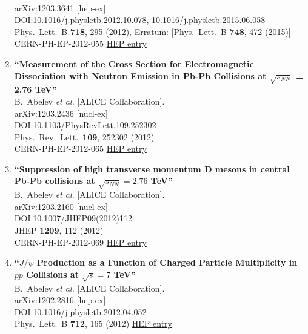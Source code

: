 \begin{enumerate}
  \\{}arXiv:1203.3641 [hep-ex]
  \\{}DOI:10.1016/j.physletb.2012.10.078, 10.1016/j.physletb.2015.06.058
  \\{}Phys.\ Lett.\ B {\bf 718}, 295 (2012), Erratum: [Phys.\ Lett.\ B {\bf 748}, 472 (2015)]
  \\{}CERN-PH-EP-2012-055
\href{http://inspirehep.net/record/1094079}{HEP entry}
\item%
{\bf ``Measurement of the Cross Section for Electromagnetic Dissociation with Neutron Emission in Pb-Pb Collisions at $\sqrt{s_{NN}}$ = 2.76 TeV''}
  \\{}B.~Abelev {\it et al.} [ALICE Collaboration].
  \\{}arXiv:1203.2436 [nucl-ex]
  \\{}DOI:10.1103/PhysRevLett.109.252302
  \\{}Phys.\ Rev.\ Lett.\  {\bf 109}, 252302 (2012)
  \\{}CERN-PH-EP-2012-065
\href{http://inspirehep.net/record/1093519}{HEP entry}
\item%
{\bf ``Suppression of high transverse momentum D mesons in central Pb-Pb collisions at $\sqrt{s_{NN}}=2.76$ TeV''}
  \\{}B.~Abelev {\it et al.} [ALICE Collaboration].
  \\{}arXiv:1203.2160 [nucl-ex]
  \\{}DOI:10.1007/JHEP09(2012)112
  \\{}JHEP {\bf 1209}, 112 (2012)
  \\{}CERN-PH-EP-2012-069
\href{http://inspirehep.net/record/1093488}{HEP entry}
\item%
{\bf ``$J/\psi$ Production as a Function of Charged Particle Multiplicity in $pp$ Collisions at $\sqrt{s} = 7$ TeV''}
  \\{}B.~Abelev {\it et al.} [ALICE Collaboration].
  \\{}arXiv:1202.2816 [hep-ex]
  \\{}DOI:10.1016/j.physletb.2012.04.052
  \\{}Phys.\ Lett.\ B {\bf 712}, 165 (2012)
\href{http://inspirehep.net/record/1088833}{HEP entry}

\end{enumerate}
